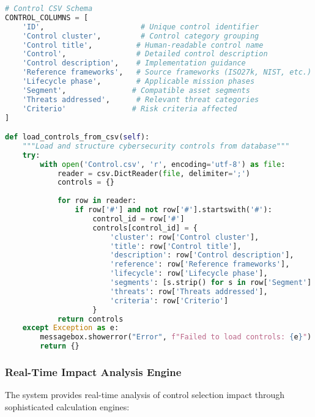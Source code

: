 \documentclass[binding=0.6cm]{sapthesis}
\begin{document}
\begin{lstlisting}[language=Python, caption=Control Database Structure]
# Control CSV Schema
CONTROL_COLUMNS = [
    'ID',                      # Unique control identifier
    'Control cluster',         # Control category grouping
    'Control title',          # Human-readable control name
    'Control',                # Detailed control description
    'Control description',    # Implementation guidance
    'Reference frameworks',   # Source frameworks (ISO27k, NIST, etc.)
    'Lifecycle phase',        # Applicable mission phases
    'Segment',               # Compatible asset segments
    'Threats addressed',      # Relevant threat categories
    'Criterio'               # Risk criteria affected
]

def load_controls_from_csv(self):
    """Load and structure cybersecurity controls from database"""
    try:
        with open('Control.csv', 'r', encoding='utf-8') as file:
            reader = csv.DictReader(file, delimiter=';')
            controls = {}
            
            for row in reader:
                if row['#'] and not row['#'].startswith('#'):
                    control_id = row['#']
                    controls[control_id] = {
                        'cluster': row['Control cluster'],
                        'title': row['Control title'],
                        'description': row['Control description'],
                        'reference': row['Reference frameworks'],
                        'lifecycle': row['Lifecycle phase'],
                        'segments': [s.strip() for s in row['Segment'].split(',')],
                        'threats': row['Threats addressed'],
                        'criteria': row['Criterio']
                    }
            return controls
    except Exception as e:
        messagebox.showerror("Error", f"Failed to load controls: {e}")
        return {}
\end{lstlisting}

\subsubsection{Real-Time Impact Analysis Engine}

The system provides real-time analysis of control selection impact through sophisticated calculation engines:
\end{document}
